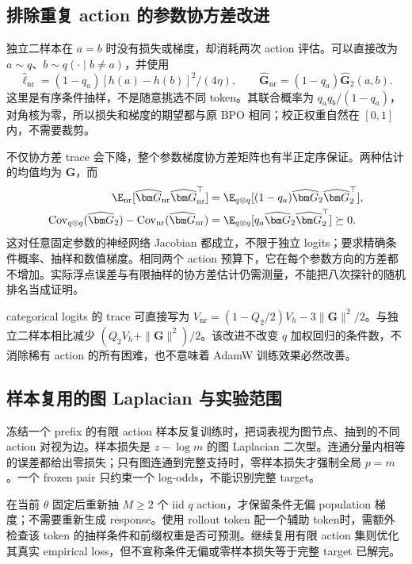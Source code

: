 \subsection{排除重复 action 的参数协方差改进}

独立二样本在 $a=b$ 时没有损失或梯度，却消耗两次 action 评估。可以直接改为 $a\sim q$、$b\sim q(\cdot\mid b\ne a)$，并使用
\begin{equation}
 \widehat\ell_{\mathrm{nr}}=(1-q_a)[h(a)-h(b)]^2/(4\eta),\qquad
 \widehat{\bm G}_{\mathrm{nr}}=(1-q_a)\widehat{\bm G}_2(a,b).
\end{equation}
这里是有序条件抽样，不是随意挑选不同 token。其联合概率为 $q_aq_b/(1-q_a)$，对角核为零，所以损失和梯度的期望都与原 BPO 相同；校正权重自然在 $[0,1]$ 内，不需要裁剪。

不仅协方差 trace 会下降，整个参数梯度协方差矩阵也有半正定序保证。两种估计的均值均为 $\bm G$，而
\begin{align}
 \E_{\mathrm{nr}}[\widehat{\bm G}_{\mathrm{nr}}\widehat{\bm G}_{\mathrm{nr}}^\top]
 &=\E_{q\otimes q}[(1-q_a)\widehat{\bm G}_2\widehat{\bm G}_2^\top],\\
 \operatorname{Cov}_{q\otimes q}(\widehat{\bm G}_2)
 -\operatorname{Cov}_{\mathrm{nr}}(\widehat{\bm G}_{\mathrm{nr}})
 &=\E_{q\otimes q}[q_a\widehat{\bm G}_2\widehat{\bm G}_2^\top]\succeq0.
\end{align}
这对任意固定参数的神经网络 Jacobian 都成立，不限于独立 logits；要求精确条件概率、抽样和数值梯度。相同两个 action 预算下，它在每个参数方向的方差都不增加。实际浮点误差与有限抽样的协方差估计仍需测量，不能把八次探针的随机排名当成证明。

categorical logits 的 trace 可直接写为 $V_{\mathrm{nr}}=(1-Q_2/2)V_h-3\|\bm G\|^2/2$。与独立二样本相比减少 $(Q_2V_h+\|\bm G\|^2)/2$。该改进不改变 $q$ 加权回归的条件数，不消除稀有 action 的所有困难，也不意味着 AdamW 训练效果必然改善。
\subsection{样本复用的图 Laplacian 与实验范围}

冻结一个 prefix 的有限 action 样本反复训练时，把词表视为图节点、抽到的不同 action 对视为边。样本损失是 $z-\log m$ 的图 Laplacian 二次型。连通分量内相等的误差都给出零损失；只有图连通到完整支持时，零样本损失才强制全局 $p=m$。一个 frozen pair 只约束一个 log-odds，不能识别完整 target。

在当前 $\theta$ 固定后重新抽 $M\ge2$ 个 iid $q$ action，才保留条件无偏 population 梯度；不需要重新生成 response。使用 rollout token 配一个辅助 token时，需额外检查该 token 的抽样条件和前缀权重是否可预测。继续复用有限 action 集则优化其真实 empirical loss，但不宣称条件无偏或零样本损失等于完整 target 已解完。

